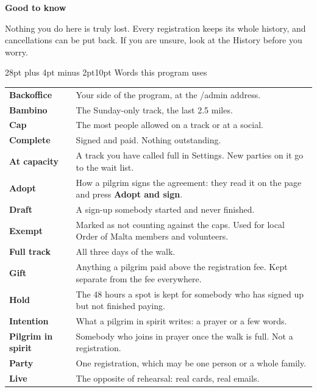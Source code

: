\documentclass[12pt]{article}
\makeatletter
\renewcommand\section{\@startsection{section}{1}{0pt}%
  {28pt plus 4pt minus 2pt}{10pt}%
  {\normalfont\Large\bfseries\color{accent}}}
\newcommand{\notecolour}{softbg}
\newenvironment{note}[2][softbg]
  {\renewcommand{\notecolour}{#1}%
   \par\medskip
   \setlength{\fboxsep}{11pt}%
   \begin{lrbox}{\notebox}%
   \begin{minipage}{\dimexpr\linewidth-2\fboxsep\relax}%
   \setlength{\parskip}{7pt}%
   \textbf{#2}\par}
  {\end{minipage}%
   \end{lrbox}%
   \noindent\expandafter\colorbox\expandafter{\notecolour}{\usebox{\notebox}}%
   \par\medskip}
\newcommand{\btn}[1]{\textbf{#1}}
\makeatother
\begin{document}
\begin{note}{Good to know}
Nothing you do here is truly lost. Every registration keeps its whole
history, and cancellations can be put back. If you are unsure, look at
the History before you worry.
\end{note}

\section{Words this program uses}

\begin{tabularx}{\linewidth}{@{}L{1.5in}Y@{}}
\toprule
\textbf{Backoffice} & Your side of the program, at the /admin address. \\
\textbf{Bambino} & The Sunday-only track, the last 2.5 miles. \\
\textbf{Cap} & The most people allowed on a track or at a social. \\
\textbf{Complete} & Signed and paid. Nothing outstanding. \\
\textbf{At capacity} & A track you have called full in Settings. New
parties on it go to the wait list. \\
\textbf{Adopt} & How a pilgrim signs the agreement: they read it on the
page and press \btn{Adopt and sign}. \\
\textbf{Draft} & A sign-up somebody started and never finished. \\
\textbf{Exempt} & Marked as not counting against the caps. Used for
local Order of Malta members and volunteers. \\
\textbf{Full track} & All three days of the walk. \\
\textbf{Gift} & Anything a pilgrim paid above the registration fee. Kept
separate from the fee everywhere. \\
\textbf{Hold} & The 48 hours a spot is kept for somebody who has signed
up but not finished paying. \\
\textbf{Intention} & What a pilgrim in spirit writes: a prayer or a
few words. \\
\textbf{Pilgrim in spirit} & Somebody who joins in prayer once the walk
is full. Not a registration. \\
\textbf{Party} & One registration, which may be one person or a whole
family. \\
\textbf{Live} & The opposite of rehearsal: real cards, real emails. \\

\end{tabularx}
\end{document}
